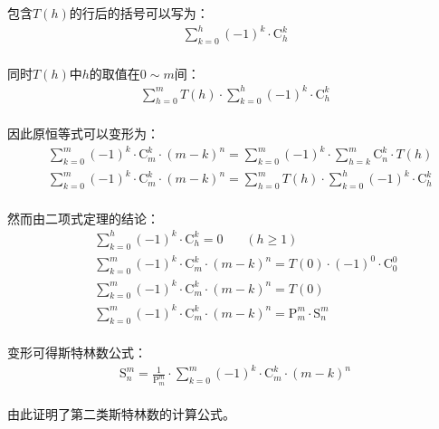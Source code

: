 \documentclass[UTF8]{ctexart}
\newcommand{\Pe}{\mathrm{P}}
\newcommand{\Co}{\mathrm{C}}
\newcommand{\St}{\mathrm{S}}
\begin{document}
    包含$T(h)$的行后的括号可以写为：
    \begin{align}
        \sum_{k=0}^{h}(-1)^k\cdot\Co_h^k
    \end{align}\\
    同时$T(h)$中$h$的取值在$0\sim m$间：
    \begin{align}
        \sum_{h=0}^mT(h)\cdot\sum_{k=0}^h(-1)^k\cdot\Co_h^k
    \end{align}\\
    因此原恒等式可以变形为：
    \begin{align}
        &\sum_{k=0}^m(-1)^k\cdot\Co_m^k\cdot(m-k)^n=\sum_{k=0}^m(-1)^k\cdot\sum_{h=k}^m\Co_n^k\cdot T(h)\\[8mm]
        &\sum_{k=0}^m(-1)^k\cdot\Co_m^k\cdot(m-k)^n=\sum_{h=0}^mT(h)\cdot\sum_{k=0}^h(-1)^k\cdot\Co_h^k
    \end{align}\\[2mm]
    然而由二项式定理的结论：
    \begin{align}
        &~~~~\sum_{k=0}^h(-1)^k\cdot\Co_h^k=0~~~~~~~~(h\geq 1)\\[8mm]
        &~~~~\sum_{k=0}^m(-1)^k\cdot\Co_m^k\cdot(m-k)^n=T(0)\cdot(-1)^0\cdot\Co_0^0\\[8mm]
        &~~~~\sum_{k=0}^m(-1)^k\cdot\Co_m^k\cdot(m-k)^n=T(0)\\[8mm]
        &~~~~\sum_{k=0}^m(-1)^k\cdot\Co_m^k\cdot(m-k)^n=\Pe_m^m\cdot\St_n^m
    \end{align}\\[2mm]
    变形可得斯特林数公式：
    \begin{align}
        \St_n^m=\frac{1}{\Pe_m^m}\cdot\sum_{k=0}^{m}(-1)^k\cdot\Co_m^k\cdot(m-k)^n
    \end{align}\\
    由此证明了第二类斯特林数的计算公式。

\newpage
\end{document}
